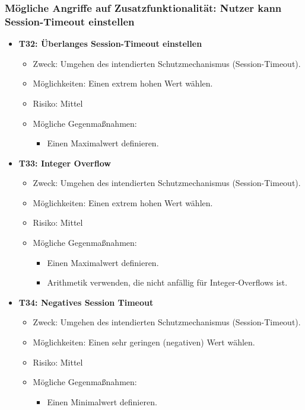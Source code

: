 \documentclass[12pt,DIV14,BCOR10mm,a4paper,parskip=half-,headsepline,headinclude,english,ngerman,bibliography=totocnumbered]{scrreprt}
\begin{document}
\subsubsection{Mögliche Angriffe auf Zusatzfunktionalität: Nutzer kann Session-Timeout einstellen}

\begin{itemize}

  \hypertarget{threat32}{}
  \item \textbf{T32: Überlanges Session-Timeout einstellen}
  \begin{itemize}
    \item Zweck: Umgehen des intendierten Schutzmechanismus (Session-Timeout).
    \item Möglichkeiten: Einen extrem hohen Wert wählen.
    \item Risiko: Mittel
    \item Mögliche Gegenmaßnahmen:
      \begin{itemize}
      \item Einen Maximalwert definieren.
      \end{itemize}
  \end{itemize}

  \hypertarget{threat33}{}
  \item \textbf{T33: Integer Overflow}
  \begin{itemize}
    \item Zweck: Umgehen des intendierten Schutzmechanismus (Session-Timeout).
    \item Möglichkeiten: Einen extrem hohen Wert wählen.
    \item Risiko: Mittel
    \item Mögliche Gegenmaßnahmen:
      \begin{itemize}
      \item Einen Maximalwert definieren.
      \item Arithmetik verwenden, die nicht anfällig für Integer-Overflows ist.
      \end{itemize}
  \end{itemize}

  \hypertarget{threat34}{}
  \item \textbf{T34: Negatives Session Timeout}
  \begin{itemize}
    \item Zweck: Umgehen des intendierten Schutzmechanismus (Session-Timeout).
    \item Möglichkeiten: Einen sehr geringen (negativen) Wert wählen.
    \item Risiko: Mittel
    \item Mögliche Gegenmaßnahmen:
      \begin{itemize}
      \item Einen Minimalwert definieren.
      \end{itemize}
  \end{itemize}
\end{itemize}
\end{document}
